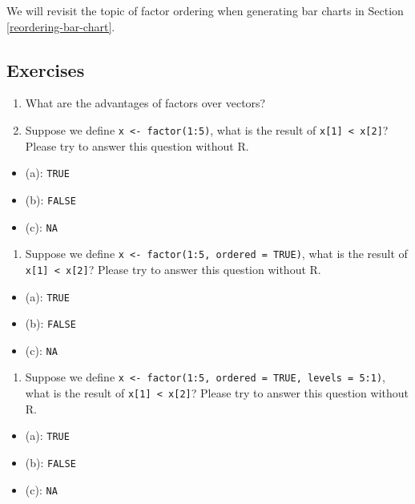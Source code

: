 \documentclass[
]{book}
\providecommand{\tightlist}{%
  \setlength{\itemsep}{0pt}\setlength{\parskip}{0pt}}
\begin{document}
We will revisit the topic of factor ordering when generating bar charts in Section \ref{reordering-bar-chart}.

\hypertarget{exercises-13}{%
\subsection{Exercises}\label{exercises-13}}

\begin{enumerate}
\def\labelenumi{\arabic{enumi}.}
\tightlist
\item
  What are the advantages of factors over vectors?
\item
  Suppose we define \texttt{x\ \textless{}-\ factor(1:5)}, what is the result of \texttt{x{[}1{]}\ \textless{}\ x{[}2{]}}? Please try to answer this question without R.
\end{enumerate}

\begin{itemize}
\tightlist
\item
  (a): \texttt{TRUE}
\item
  (b): \texttt{FALSE}
\item
  (c): \texttt{NA}
\end{itemize}

\begin{enumerate}
\def\labelenumi{\arabic{enumi}.}
\setcounter{enumi}{2}
\tightlist
\item
  Suppose we define \texttt{x\ \textless{}-\ factor(1:5,\ ordered\ =\ TRUE)}, what is the result of \texttt{x{[}1{]}\ \textless{}\ x{[}2{]}}? Please try to answer this question without R.
\end{enumerate}

\begin{itemize}
\tightlist
\item
  (a): \texttt{TRUE}
\item
  (b): \texttt{FALSE}
\item
  (c): \texttt{NA}
\end{itemize}

\begin{enumerate}
\def\labelenumi{\arabic{enumi}.}
\setcounter{enumi}{3}
\tightlist
\item
  Suppose we define \texttt{x\ \textless{}-\ factor(1:5,\ ordered\ =\ TRUE,\ levels\ =\ 5:1)}, what is the result of \texttt{x{[}1{]}\ \textless{}\ x{[}2{]}}? Please try to answer this question without R.
\end{enumerate}

\begin{itemize}
\tightlist
\item
  (a): \texttt{TRUE}
\item
  (b): \texttt{FALSE}
\item
  (c): \texttt{NA}
\end{itemize}
\end{document}
